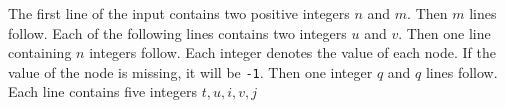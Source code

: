 The first line of the input contains two positive integers $n$ and $m$. 
Then $m$ lines follow. 
Each of the following lines contains two integers $u$ and $v$. 
Then one line containing $n$ integers follow. 
Each integer denotes the value of each node. 
If the value of the node is missing, it will be \verb+-1+. 
Then one integer $q$ and $q$ lines follow. 
Each line contains five integers $t, u, i, v, j$
